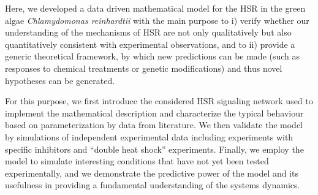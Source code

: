 \documentclass[oneside, 10pt, a4paper, twocolumn]{article}
\begin{document}

Here, we developed a data driven mathematical model for the HSR in the green algae \emph{Chlamydomonas {reinhardtii}}
with the main purpose to i) verify whether our understanding of the mechanisms of HSR are not only qualitatively but also quantitatively  consistent with experimental observations,
and to ii) provide a generic theoretical framework, by which new predictions can be made (such as responses to chemical treatments or genetic modifications) 
and thus novel hypotheses can be generated.

For this purpose, we first introduce the considered HSR signaling network used to implement the mathematical description and characterize the typical behaviour 
based on parameterization by data from literature. 
We then validate the model by simulations of independent experimental data including experiments with specific inhibitors and  ``double heat shock'' experiments. 
Finally, we employ the model to simulate interesting conditions that have not yet been 
tested experimentally, and we demonstrate the predictive power of the model and its usefulness in providing a fundamental understanding of the 
systems dynamics. 
\end{document}
